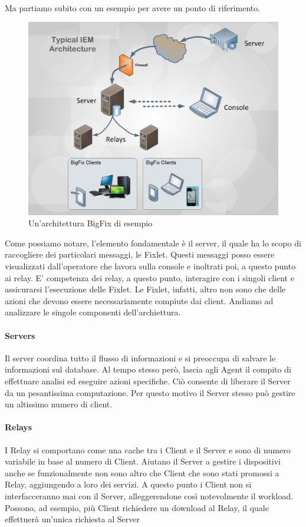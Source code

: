 \paragraph{}
Ma partiamo subito con un esempio per avere un ponto di riferimento.
\begin{figure}[h!]
	\centering
	\includegraphics[width=\textwidth,keepaspectratio=true]{capitoli/imgs/IEMArchitecture.png}
	\caption{Un'architettura BigFix di esempio}
\end{figure}
Come possiamo notare, l'elemento fondamentale è il server, il quale ha lo scopo di raccogliere dei particolari messaggi, le Fixlet. Questi messaggi posso essere visualizzati dall'operatore che lavora sulla console e inoltrati poi, a questo punto ai relay. E' competenza dei relay, a questo punto, interagire con i singoli client e assicurarsi l'esecuzione delle Fixlet. Le Fixlet, infatti, altro non sono che delle azioni che devono essere necessariamente compiute dai client.
Andiamo ad analizzare le singole componenti dell'archiettura.
\paragraph{Servers}
Il server coordina tutto il flusso di informazioni e si preoccupa di salvare le informazioni sul database. Al tempo stesso però, lascia agli Agent il compito di effettuare analisi ed eseguire azioni specifiche. Ciò consente di liberare il Server da un pesantissima computazione. Per questo motivo il Server stesso può gestire un altissimo numero di client.
\paragraph{Relays}
I Relay si comportano come una cache tra i Client e il Server e sono di numero variabile in base al numero di Client. Aiutano il Server a gestire i dispositivi anche se funzionalmente non sono altro che Client che sono stati promossi a Relay, aggiungendo a loro dei servizi. A questo punto i Client non si interfacceranno mai con il Server, alleggerendone così notevolmente il workload. Possono, ad esempio, più Client richiedere un download al Relay, il quale effettuerà un'unica richiesta al Server
